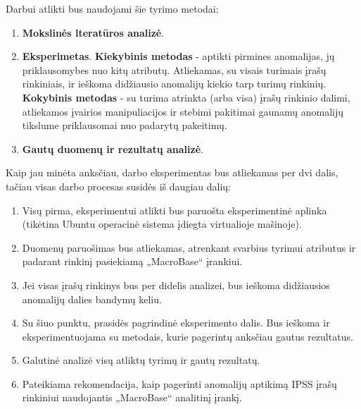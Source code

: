 \documentclass{VUMIFPSbakalaurinis}
\begin{document}
Darbui atlikti bus naudojami šie tyrimo metodai:

\begin{enumerate}
	\item \textbf{Mokslinės lteratūros analizė}.
	\item \textbf{Eksperimetas}.
	\subitem \textbf{Kiekybinis metodas} - aptikti pirmines anomalijas, jų priklausomybes nuo kitų atributų. Atliekamas, su visais turimais įrašų rinkiniais, ir ieškoma didžiausio anomalijų kiekio tarp turimų rinkinių.
	\subitem \textbf{Kokybinis metodas} - su turima atrinkta (arba visa) įrašų rinkinio dalimi, atliekamos įvairios manipuliacijos ir stebimi pakitimai gaunamų anomalijų tikslume priklausomai nuo padarytų pakeitimų. 
	\item \textbf{Gautų duomenų ir rezultatų analizė}.
\end{enumerate}

Kaip jau minėta anksčiau, darbo eksperimentas bus atliekamas per dvi dalis, tačiau visas darbo procesas susidės iš daugiau dalių:

\begin{enumerate}
	\item Visų pirma, eksperimentui atlikti bus paruošta eksperimentinė aplinka (tikėtina Ubuntu operacinė sistema įdiegta virtualioje mašinoje).
	\item Duomenų paruošimas bus atliekamas, atrenkant svarbius tyrimui atributus ir padarant rinkinį pasiekiamą „MacroBase“ įrankiui.
	\item Jei visas įrašų rinkinys bus per didelis analizei, bus ieškoma didžiausios anomalijų dalies bandymų keliu.
	\item Su šiuo punktu, prasidės pagrindinė eksperimento dalis. Bus ieškoma ir eksperimentuojama su metodais, kurie pagerintų anksčiau gautus rezultatus.
	\item Galutinė analizė visų atliktų tyrimų ir gautų rezultatų.
	\item Pateikiama rekomendacija, kaip pagerinti anomalijų aptikimą IPSS įrašų rinkiniui naudojantis „MacroBase“ analitinį įrankį.
\end{enumerate}


\end{document}
